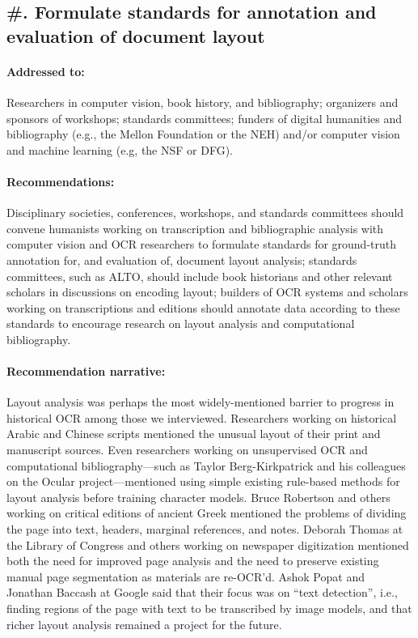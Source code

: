 \documentclass[twoside,11pt]{report}
\newcounter{reccounter}
\renewcommand{\thereccounter}{\arabic{reccounter}}
\newcommand{\recommend}[2]{\refstepcounter{reccounter}%
  \label{rec:#1}%
  \subsection{\#\thereccounter. #2}%
  \label{sec:rec-#1}}
\begin{document}
\recommend{layout}{Formulate standards for annotation and evaluation of document layout}

\paragraph{Addressed to:} Researchers in computer vision, book history, and bibliography; organizers and sponsors of workshops; standards committees; funders of digital humanities and bibliography (e.g., the Mellon Foundation or the NEH) and/or computer vision and machine learning (e.g, the NSF or DFG).

\paragraph{Recommendations:} Disciplinary societies, conferences, workshops, and standards committees should convene humanists working on transcription and bibliographic analysis with computer vision and OCR researchers to formulate standards for ground-truth annotation for, and evaluation of, document layout analysis; standards committees, such as ALTO, should include book historians and other relevant scholars in discussions on encoding layout; builders of OCR systems and scholars working on transcriptions and editions should annotate data according to these standards to encourage research on layout analysis and computational bibliography.

\paragraph{Recommendation narrative:}

Layout analysis was perhaps the most widely-mentioned barrier to progress in historical OCR among those we interviewed. Researchers working on historical Arabic and Chinese scripts mentioned the unusual layout of their print and manuscript sources. Even researchers working on unsupervised OCR and computational bibliography---such as Taylor Berg-Kirkpatrick and his colleagues on the Ocular project---mentioned using simple existing rule-based methods for layout analysis before training character models. Bruce Robertson and others working on critical editions of ancient Greek mentioned the problems of dividing the page into text, headers, marginal references, and notes. Deborah Thomas at the Library of Congress and others working on newspaper digitization mentioned both the need for improved page analysis and the need to preserve existing manual page segmentation as materials are re-OCR'd. Ashok Popat and Jonathan Baccash at Google said that their focus was on ``text detection'', i.e., finding regions of the page with text to be transcribed by image models, and that richer layout analysis remained a project for the future.
\end{document}
